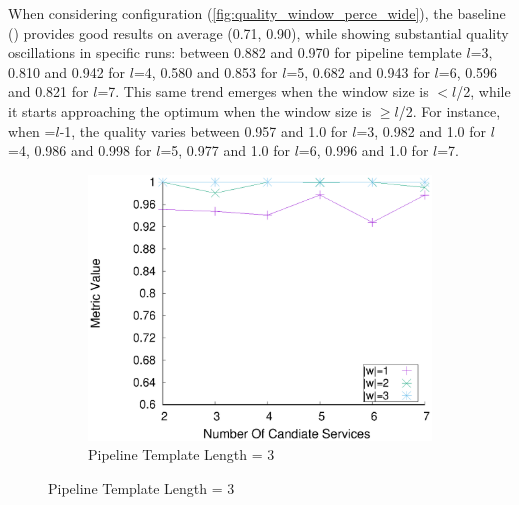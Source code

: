     When considering configuration \wide (\cref{fig:quality_window_perce_wide}), the baseline () provides good results on average (0.71, 0.90), while showing substantial quality oscillations in specific runs: between 0.882 and 0.970 for pipeline template $l$=3, 0.810 and 0.942 for $l$=4, 0.580 and 0.853 for $l$=5, 0.682 and 0.943 for $l$=6, 0.596 and 0.821 for $l$=7. This same trend emerges when the window size is $<$$l$/2, while it starts approaching the optimum when the window size is $\geq$$l$/2. For instance, when \windowsize=$l$-1, the quality varies between 0.957 and 1.0 for $l$=3, 0.982 and 1.0 for $l$=4, 0.986 and 0.998 for $l$=5, 0.977 and 1.0 for $l$=6, 0.996 and 1.0 for $l$=7.

    \begin{figure}[ht!]
      \centering
      \begin{subfigure}{0.49\textwidth}
        \includegraphics[width=\textwidth]{Images/graphs/window_quality_performance_diff_perce_n7_s7_50_89_n3}
        \caption{Pipeline Template Length = 3}


\end{subfigure}
\end{figure}
